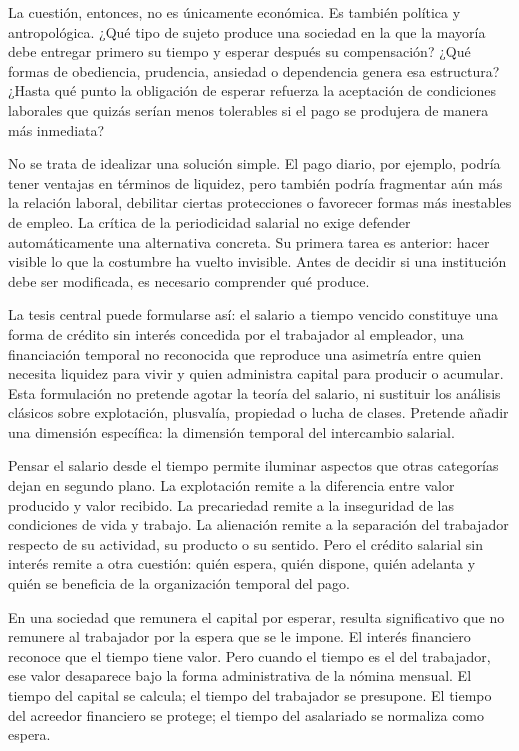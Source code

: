 \documentclass[12pt,a4paper]{article}
\begin{document}
La cuestión, entonces, no es únicamente económica. Es también política y antropológica. ¿Qué tipo de sujeto produce una sociedad en la que la mayoría debe entregar primero su tiempo y esperar después su compensación? ¿Qué formas de obediencia, prudencia, ansiedad o dependencia genera esa estructura? ¿Hasta qué punto la obligación de esperar refuerza la aceptación de condiciones laborales que quizás serían menos tolerables si el pago se produjera de manera más inmediata?

No se trata de idealizar una solución simple. El pago diario, por ejemplo, podría tener ventajas en términos de liquidez, pero también podría fragmentar aún más la relación laboral, debilitar ciertas protecciones o favorecer formas más inestables de empleo. La crítica de la periodicidad salarial no exige defender automáticamente una alternativa concreta. Su primera tarea es anterior: hacer visible lo que la costumbre ha vuelto invisible. Antes de decidir si una institución debe ser modificada, es necesario comprender qué produce.

La tesis central puede formularse así: el salario a tiempo vencido constituye una forma de crédito sin interés concedida por el trabajador al empleador, una financiación temporal no reconocida que reproduce una asimetría entre quien necesita liquidez para vivir y quien administra capital para producir o acumular. Esta formulación no pretende agotar la teoría del salario, ni sustituir los análisis clásicos sobre explotación, plusvalía, propiedad o lucha de clases. Pretende añadir una dimensión específica: la dimensión temporal del intercambio salarial.

Pensar el salario desde el tiempo permite iluminar aspectos que otras categorías dejan en segundo plano. La explotación remite a la diferencia entre valor producido y valor recibido. La precariedad remite a la inseguridad de las condiciones de vida y trabajo. La alienación remite a la separación del trabajador respecto de su actividad, su producto o su sentido. Pero el crédito salarial sin interés remite a otra cuestión: quién espera, quién dispone, quién adelanta y quién se beneficia de la organización temporal del pago.

En una sociedad que remunera el capital por esperar, resulta significativo que no remunere al trabajador por la espera que se le impone. El interés financiero reconoce que el tiempo tiene valor. Pero cuando el tiempo es el del trabajador, ese valor desaparece bajo la forma administrativa de la nómina mensual. El tiempo del capital se calcula; el tiempo del trabajador se presupone. El tiempo del acreedor financiero se protege; el tiempo del asalariado se normaliza como espera.
\end{document}
